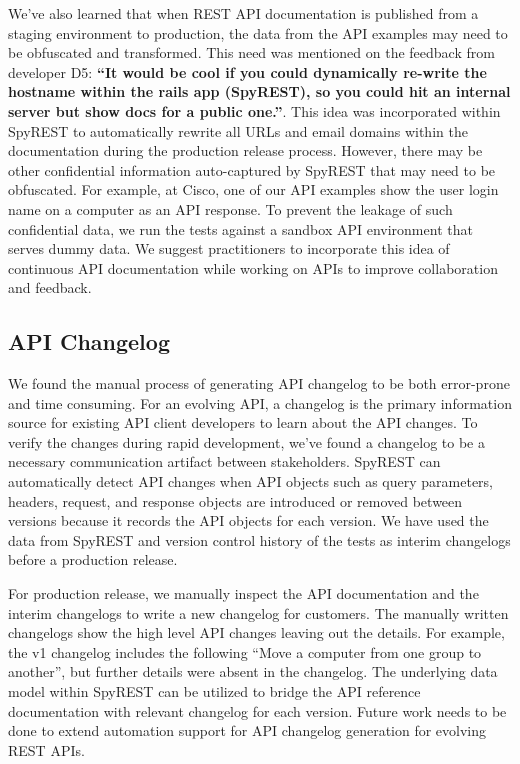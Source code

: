 We've also learned that when REST API documentation is published from a staging environment to production, the data from the API examples may need to be obfuscated and transformed. This need was mentioned on the feedback from developer D5: \textbf{``It would be cool if you could dynamically re-write the hostname within the rails app (SpyREST), so you could hit an internal server but show docs for a public one.''}. This idea was incorporated within SpyREST to automatically rewrite all URLs and email domains within the documentation during the production release process. However, there may be other confidential information auto-captured by SpyREST that may need to be obfuscated. For example, at Cisco, one of our API examples show the user login name on a computer as an API response. To prevent the leakage of such confidential data, we run the tests against a sandbox API environment that serves dummy data. We suggest practitioners to incorporate this idea of continuous API documentation while working on APIs to improve collaboration and feedback.

\subsection{API Changelog}
We found the manual process of generating API changelog to be both error-prone and time consuming. For an evolving API, a changelog is the primary information source for existing API client developers to learn about the API changes. To verify the changes during rapid development, we've found a changelog to be a necessary communication artifact between stakeholders. SpyREST can automatically detect API changes when API objects such as query parameters, headers, request, and response objects are introduced or removed between versions because it records the API objects for each version. We have used the data from SpyREST and version control history of the tests as interim changelogs before a production release.

For production release, we manually inspect the API documentation and the interim changelogs to write a new changelog for customers. The manually written changelogs show the high level API changes leaving out the details. For example, the v1 changelog includes the following ``Move a computer from one group to another'', but further details were absent in the changelog. The underlying data model within SpyREST can be utilized to bridge the API reference documentation with relevant changelog for each version. Future work needs to be done to extend automation support for API changelog generation for evolving REST APIs.

